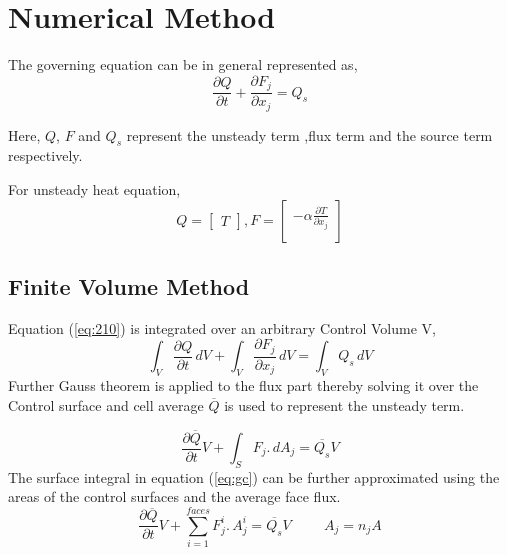 \section{Numerical Method}
\hspace{0.25cm}The governing equation can be in general represented as,
\begin{equation}\label{eq:210}
   \frac{\partial Q}{\partial t}+\frac{\partial F_j}{\partial x_j}=Q_s
\end{equation}

Here, $Q$, $F$ and $Q_s$ represent the unsteady term ,flux term and the source term respectively. 

For unsteady heat equation,
\begin{equation}
   Q=\begin{bmatrix}
   T
   \end{bmatrix},F=\begin{bmatrix}
    -\alpha\frac{\partial T}{\partial x_j}\\
   \end{bmatrix}
\end{equation}

\subsection{Finite Volume Method}
Equation (\ref{eq:210}) is integrated over an arbitrary Control Volume  V,
\begin{equation}\label{eq:int}
    \int_V\frac{\partial Q}{\partial t}\,dV +\int_V\frac{\partial F_j}{\partial x_j}\,dV=\int_VQ_s\,dV
\end{equation}
Further Gauss theorem is applied to the flux part thereby solving it over the Control surface  and cell average 
$\overline{Q}$ is used to represent the unsteady term.

\begin{equation}\label{eq:gc}
    \frac{\partial \overline{Q}}{\partial t}V+ \int_S  F_j.\,dA_j = \overline{Q_s} V
\end{equation}
The surface integral in equation (\ref{eq:gc}) can be further approximated using the areas of the control surfaces and the average face flux.
\begin{equation}\label{eq:ahf}
    \frac{\partial \overline{Q}}{\partial t}V +  \sum\limits_{i=1}^{faces}  F_j^i.\,A_j^i = \overline{Q_s} V \hspace{1cm} A_j=n_j A
\end{equation}




